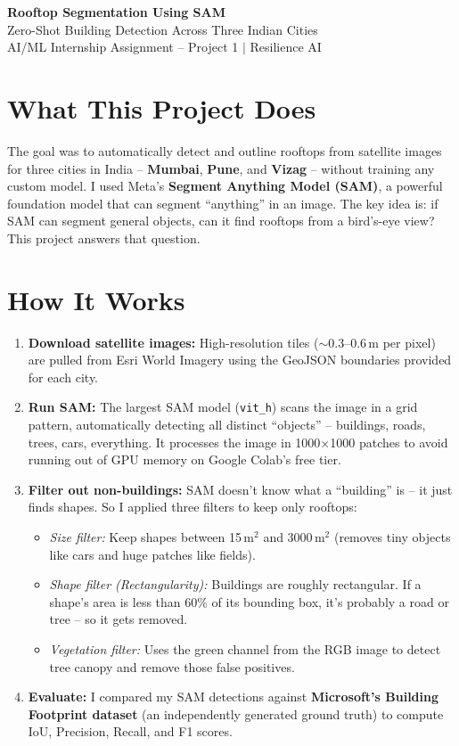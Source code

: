 \documentclass[9pt, a4paper]{article}
\begin{document}
\begin{center}
    {\Large\bfseries\color{darkblue} Rooftop Segmentation Using SAM}\\[2pt]
    {\small Zero-Shot Building Detection Across Three Indian Cities}\\[1pt]
    {\footnotesize\color{gray} AI/ML Internship Assignment -- Project 1 $\mid$ Resilience AI}
\end{center}

\section*{What This Project Does}

The goal was to automatically detect and outline rooftops from satellite images for three cities in India -- \textbf{Mumbai}, \textbf{Pune}, and \textbf{Vizag} -- without training any custom model. I used Meta's \textbf{Segment Anything Model (SAM)}, a powerful foundation model that can segment ``anything'' in an image. The key idea is: if SAM can segment general objects, can it find rooftops from a bird's-eye view? This project answers that question.

\section*{How It Works}

\begin{enumerate}[nosep, leftmargin=1.2em]
    \item \textbf{Download satellite images:} High-resolution tiles ($\sim$0.3--0.6\,m per pixel) are pulled from Esri World Imagery using the GeoJSON boundaries provided for each city.
    \item \textbf{Run SAM:} The largest SAM model (\texttt{vit\_h}) scans the image in a grid pattern, automatically detecting all distinct ``objects'' -- buildings, roads, trees, cars, everything. It processes the image in 1000$\times$1000 patches to avoid running out of GPU memory on Google Colab's free tier.
    \item \textbf{Filter out non-buildings:} SAM doesn't know what a ``building'' is -- it just finds shapes. So I applied three filters to keep only rooftops:
    \begin{itemize}[nosep, leftmargin=1em]
        \item \textit{Size filter:} Keep shapes between 15\,m$^2$ and 3000\,m$^2$ (removes tiny objects like cars and huge patches like fields).
        \item \textit{Shape filter (Rectangularity):} Buildings are roughly rectangular. If a shape's area is less than 60\% of its bounding box, it's probably a road or tree -- so it gets removed.
        \item \textit{Vegetation filter:} Uses the green channel from the RGB image to detect tree canopy and remove those false positives.
    \end{itemize}
    \item \textbf{Evaluate:} I compared my SAM detections against \textbf{Microsoft's Building Footprint dataset} (an independently generated ground truth) to compute IoU, Precision, Recall, and F1 scores.
\end{enumerate}
\end{document}
